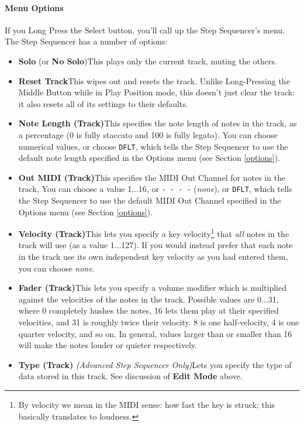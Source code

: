 \documentclass{article}
\begin{document}
\paragraph{Menu Options}

If you Long Press the Select button, you'll call up the Step Sequencer's menu.  The Step Sequencer has a number of options:

\begin{itemize}
\item {\bf Solo} (or {\bf No Solo})\quad This plays only the current track, muting the others.
\item {\bf Reset Track}\quad This wipes out and resets the track.  Unlike Long-Pressing the Middle Button while in Play Position mode, this doesn't just clear the track: it also resets all of its settings to their defaults.
\item {\bf Note Length (Track)}\quad This specifies the note length of notes in the track, as a percentage (0 is fully staccato and 100 is fully legato).   You can choose numerical values, or choose \texttt{DFLT}, which tells the Step Sequencer to use the default note length specified in the Options menu (see Section \ref{options}).
\item {\bf Out MIDI (Track)}\quad This specifies the MIDI Out Channel for notes in the track,    You can choose a value 1...16, or \texttt{- - - -} ({\it none}), or \texttt{DFLT}, which tells the Step Sequencer to use the default MIDI Out Channel specified in the Options menu (see Section \ref{options}).
\item {\bf Velocity (Track)}\quad This lets you specify a key velocity\footnote{By velocity we mean in the MIDI sense: how fast the key is struck; this basically translates to loudness.} that {\it all} notes in the track will use (as a value 1...127).  If you would instead prefer that each note in the track use its own independent key velocity as you had entered them, you can choose {\it none}.
\item {\bf Fader (Track)}\quad This lets you specify a volume modifier which is multiplied against the velocities of the notes in the track.  Possible values are 0...31, where 0 completely hushes the notes, 16 lets them play at their specified velocities, and 31 is roughly twice their velocity.  8 is one half-velocity, 4 is one quarter velocity, and so on.  In general, values larger than or smaller than 16 will make the notes louder or quieter respectively.
\item {\bf Type (Track)} {\it (Advanced Step Sequencer Only)}\quad Lets you specify the type of data stored in this track.  See discussion of {\bf Edit Mode} above.

\end{itemize}
\end{document}
